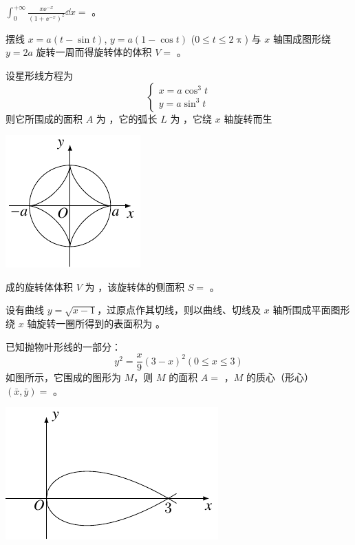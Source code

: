 \begin{ti}
	$\int_0^{+\infty} \frac{x \ee^{-x}}{(1 + \ee^{-x})^2} \dd{x} = $ \hua。
\end{ti}

\begin{ti}
	摆线 $x = a (t - \sin t)$, $y = a(1 - \cos t)$ ($0 \leq t \leq 2 \uppi$) 与 $x$ 轴围成图形绕 $y = 2a$ 旋转一周而得旋转体的体积 $V = $ \hua。
\end{ti}

\begin{ti}
	\parbox[t]{0.7\textwidth}{%
	\vspace{0pt}设星形线方程为
	\[
		\begin{cases}
			x = a \cos^3 t \\
			y = a \sin^3 t
		\end{cases}
	\]
	则它所围成的面积 $A$ 为 \hua，它的弧长 $L$ 为 \hua，它绕 $x$ 轴旋转而生
	}\vspace{4.5bp}%
	\parbox[t]{0.3\textwidth}{\centering\vspace{0pt}\includegraphics{figure/fig71.pdf}}
	成的旋转体体积 $V$ 为 \hua，该旋转体的侧面积 $S = $ \hua。
\end{ti}

\begin{ti}
	设有曲线 $y = \sqrt{x-1}$，过原点作其切线，则以曲线、切线及 $x$ 轴所围成平面图形绕 $x$ 轴旋转一圈所得到的表面积为 \hua。
\end{ti}

\begin{ti}
	\parbox[c]{0.55\textwidth}{%
	已知抛物叶形线的一部分：
	\[
		y^2 = \frac{x}{9} (3-x)^2 (0 \leq x \leq 3)
	\]
	如图所示，它围成的图形为 $M$，则 $M$ 的面积 $A = $ \hua，$M$ 的质心（形心）$(\bar x,\bar y) = $ \hua。
	}%
	\parbox[c]{0.45\textwidth}{\centering\includegraphics{figure/fig73.pdf}}
\end{ti}

